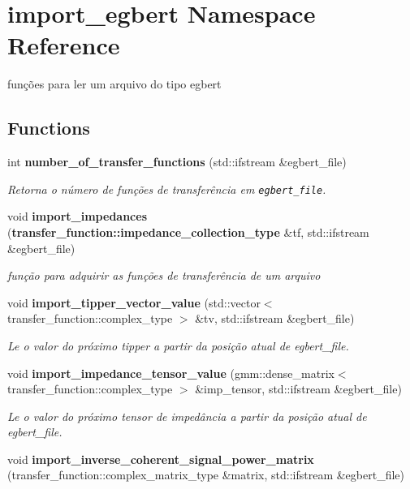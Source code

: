\section{import\_\-egbert Namespace Reference}
\label{namespaceimport__egbert}
funções para ler um arquivo do tipo egbert  


\subsection*{Functions}
\begin{CompactItemize}
\item 
int {\bf number\_\-of\_\-transfer\_\-functions} (std::ifstream \&egbert\_\-file)
\begin{CompactList}\small\item\em Retorna o número de funções de transferência em {\tt egbert\_\-file}. \item\end{CompactList}\item 
void {\bf import\_\-impedances} ({\bf transfer\_\-function::impedance\_\-collection\_\-type} \&tf, std::ifstream \&egbert\_\-file)
\begin{CompactList}\small\item\em função para adquirir as funções de transferência de um arquivo \item\end{CompactList}\item 
void {\bf import\_\-tipper\_\-vector\_\-value} (std::vector$<$ transfer\_\-function::complex\_\-type $>$ \&tv, std::ifstream \&egbert\_\-file)
\begin{CompactList}\small\item\em Le o valor do próximo tipper a partir da posição atual de {\em egbert\_\-file\/}. \item\end{CompactList}\item 
void {\bf import\_\-impedance\_\-tensor\_\-value} (gmm::dense\_\-matrix$<$ transfer\_\-function::complex\_\-type $>$ \&imp\_\-tensor, std::ifstream \&egbert\_\-file)
\begin{CompactList}\small\item\em Le o valor do próximo tensor de impedância a partir da posição atual de {\em egbert\_\-file\/}. \item\end{CompactList}\item 
void {\bf import\_\-inverse\_\-coherent\_\-signal\_\-power\_\-matrix} (transfer\_\-function::complex\_\-matrix\_\-type \&matrix, std::ifstream \&egbert\_\-file)

\end{CompactItemize}
